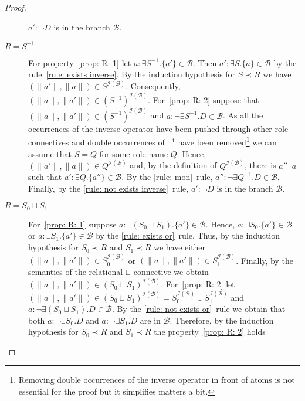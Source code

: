 \documentclass[leqno
,pdflatex
,prodmode
,acmtocl
]{acmsmall}
\newcommand{\mathcmd}[1]{\ensuremath{#1}\xspace}
\def\Not{\neg}
\def\Or{\sqcup}
\newcommand{\branch}[1]{\seg{#1}}
\newcommand{\seg}[1]{\mathcmd{\mathcal{#1}}}
\newcommand{\indiv}{a}
\newcommand{\rname}{Q}
\newcommand{\I}{\mathcal{I}}
\newcommand{\simB}{\mathop{\sim_\branch{B}}}
\newcommand{\IB}{{\I(\branch{B})}}
\begin{document}
\begin{proof}
\begin{description}
                    $\indiv':\Not D$ is in the branch $\branch{B}$.
 \item[$R=S^{-1}$] For property~\eqref{prop: R: 1} let $\indiv:\exists S^{-1}.\{\indiv'\}\in\branch{B}$.
                    Then $\indiv':\exists S.\{\indiv\}\in\branch{B}$ by the rule~\eqref{rule: exists inverse}.
                    By the induction hypothesis for $S\prec R$ we have $(\|\indiv'\|,\|\indiv\|)\in S^\IB$.
                    Consequently, $(\|\indiv\|,\|\indiv'\|)\in (S^{-1})^\IB$.
For~\eqref{prop: R: 2} suppose that 
                    $(\|\indiv\|,\|\indiv'\|)\in (S^{-1})^\IB$ and $\indiv:\Not\exists S^{-1}.D\in\branch{B}$.
                    As all the occurrences of the inverse operator have been pushed through other role connectives
                    and double occurrences
                    of ${}^{-1}$ have been removed\footnote{Removing double occurrences of the inverse operator in front of atoms
                        is not essential for the proof but it simplifies matters a bit.}
                    we can assume that $S=\rname$ for some role name $\rname$.
                    Hence, $(\|\indiv'\|,\|\indiv\|)\in \rname^\IB$ and, by the definition of $\rname^\IB$,
                    there is $\indiv''\simB\indiv$ such that $\indiv':\exists \rname.\{\indiv''\}\in\branch{B}$.
                    By the \eqref{rule: mon}~rule, $\indiv'':\Not\exists \rname^{-1}.D\in\branch{B}$.
                    Finally, by the \eqref{rule: not exists inverse}~rule, 
                    $\indiv':\Not D$ is in the branch $\branch{B}$.
 \item[$R=S_0\Or S_1$] 
    For~\eqref{prop: R: 1} suppose $\indiv:\exists (S_0\Or S_1).\{\indiv'\}\in\branch{B}$.
    Hence, $\indiv:\exists S_0.\{\indiv'\}\in\branch{B}$ or $\indiv:\exists S_1.\{\indiv'\}\in\branch{B}$
    by the \eqref{rule: exists or}~rule.
    Thus, by the induction hypothesis for $S_0\prec R$ and $S_1\prec R$ we have
    either $(\|\indiv\|,\|\indiv'\|)\in S_0^\IB$ or $(\|\indiv\|,\|\indiv'\|)\in S_1^\IB$.
    Finally, by the semantics of the relational $\Or$ connective we obtain
    $(\|\indiv\|,\|\indiv'\|)\in (S_0\Or S_1)^\IB$.
For~\eqref{prop: R: 2} let $(\|\indiv\|,\|\indiv'\|)\in (S_0\Or S_1)^\IB=S_0^\IB\cup S_1^\IB$
        and $\indiv:\Not\exists(S_0\Or S_1).D\in\branch{B}$.
    By the \eqref{rule: not exists or}~rule we obtain that both
        $\indiv:\Not\exists S_0.D$ and $\indiv:\Not\exists S_1.D$ are in $\branch{B}$.
    Therefore, by the induction hypothesis for $S_0\prec R$ and $S_1\prec R$ the property~\eqref{prop: R: 2} holds

\end{description}
\end{proof}
\end{document}

